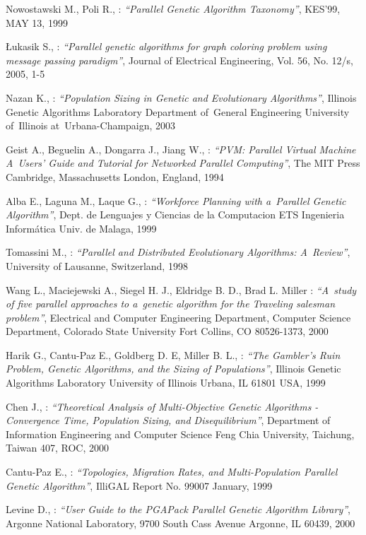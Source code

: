 \begin{thebibliography}{99}
	Nowostawski M., Poli R., : \textit{``Parallel Genetic Algorithm Taxonomy''}, 
	KES’99, MAY 13, 1999

	Łukasik S., : \textit{``Parallel genetic algorithms for graph coloring
	problem using message passing paradigm''}, Journal of Electrical
	Engineering, Vol. 56, No. 12/s, 2005, 1-5

	Nazan K., : \textit{``Population Sizing in Genetic and Evolutionary Algorithms''},
	 Illinois Genetic Algorithms Laboratory Department of~General Engineering University 
	 of~Illinois at~Urbana-Champaign, 2003

	Geist A., Beguelin A., Dongarra J., Jiang W., : \textit{``PVM: Parallel
	Virtual Machine A~Users' Guide and Tutorial for Networked Parallel
	Computing''}, The MIT Press Cambridge, Massachusetts London, England, 1994

	Alba E., Laguna M., Laque G., : \textit{``Workforce Planning with a~Parallel
	Genetic Algorithm''}, Dept. de Lenguajes y Ciencias de la
           Computacion ETS Ingenieria Informática Univ. de Malaga, 1999

	Tomassini M., : \textit{``Parallel and Distributed Evolutionary Algorithms:
	A~Review''}, University of Lausanne, Switzerland, 1998

	Wang L., Maciejewski A., Siegel H. J., Eldridge B. D., Brad L. Miller :
	\textit{``A~study of five parallel approaches to a~genetic
	algorithm for the Traveling salesman problem''}, Electrical and Computer
	Engineering Department, Computer Science Department, Colorado State University
    Fort Collins, CO 80526-1373, 2000

	Harik G., Cantu-Paz E., Goldberg D. E, Miller B. L., : \textit{``The Gambler’s Ruin Problem, Genetic Algorithms, and the Sizing of Populations''}, 
	Illinois Genetic Algorithms Laboratory University of Illinois Urbana, IL
	61801 USA, 1999

	Chen J., : \textit{``Theoretical Analysis of Multi-Objective Genetic
Algorithms - Convergence Time, Population Sizing, and Disequilibrium''}, 
Department of Information Engineering and Computer Science Feng Chia University,
Taichung, Taiwan 407, ROC, 2000

	Cantu-Paz E., : \textit{``Topologies, Migration Rates, and Multi-Population
	Parallel Genetic Algorithm''}, IlliGAL Report No. 99007 January, 1999

	Levine D., : \textit{``User Guide to the PGAPack Parallel Genetic Algorithm
	Library''}, Argonne National Laboratory, 9700 South Cass Avenue Argonne, IL
	60439, 2000


\end{thebibliography}
